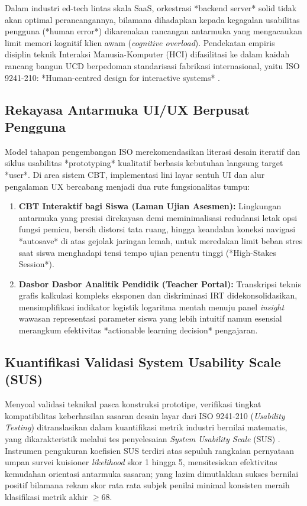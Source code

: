 Dalam industri ed-tech lintas skala SaaS, orkestrasi *backend server* solid tidak akan optimal perancangannya, bilamana dihadapkan kepada kegagalan usabilitas pengguna (*human error*) dikarenakan rancangan antarmuka yang mengacaukan limit memori kognitif klien awam (\textit{cognitive overload}). Pendekatan empiris disiplin teknik Interaksi Manusia-Komputer (HCI) difasilitasi ke dalam kaidah rancang bangun UCD berpedoman standarisasi fabrikasi internasional, yaitu ISO 9241-210: *Human-centred design for interactive systems* \citep{ISO92412010}.

\subsection{Rekayasa Antarmuka UI/UX Berpusat Pengguna}

Model tahapan pengembangan ISO merekomendasikan literasi desain iteratif dan siklus usabilitas *prototyping* kualitatif berbasis kebutuhan langsung target *user*. Di area sistem CBT, implementasi lini layar sentuh UI dan alur pengalaman UX bercabang menjadi dua rute fungsionalitas tumpu:

\begin{enumerate}
	\item \textbf{CBT Interaktif bagi Siswa (Laman Ujian Asesmen):} Lingkungan antarmuka yang presisi direkayasa demi meminimalisasi redudansi letak opsi fungsi pemicu, bersih distorsi tata ruang, hingga keandalan koneksi navigasi *autosave* di atas gejolak jaringan lemah, untuk meredakan limit beban stres saat siswa menghadapi tensi tempo ujian penentu tinggi (*High-Stakes Session*).
	\item \textbf{Dasbor Dasbor Analitik Pendidik (Teacher Portal):} Transkripsi teknis grafis kalkulasi kompleks eksponen dan diskriminasi IRT didekonsolidasikan, mensimplifikasi indikator logistik logaritma mentah menuju panel \textit{insight} wawasan representasi parameter siswa yang lebih intuitif namun esensial merangkum efektivitas *actionable learning decision* pengajaran.
\end{enumerate}

\subsection{Kuantifikasi Validasi System Usability Scale (SUS)}

Menyoal validasi teknikal pasca konstruksi prototipe, verifikasi tingkat kompatibilitas keberhasilan sasaran desain layar dari ISO 9241-210 (\textit{Usability Testing}) ditranslasikan dalam kuantifikasi metrik industri bernilai matematis, yang dikarakteristik melalui tes penyelesaian \textit{System Usability Scale} (SUS) \citep{Brooke1996}. Instrumen pengukuran koefisien SUS terdiri atas sepuluh rangkaian pernyataan umpan survei kuisioner \textit{likelihood} skor 1 hingga 5, mensitesiskan efektivitas kemudahan orientasi antarmuka sasaran; yang lazim dimutlakkan sukses bernilai positif bilamana rekam skor rata rata subjek penilai minimal konsisten meraih klasifikasi metrik akhir $\geq 68$.


